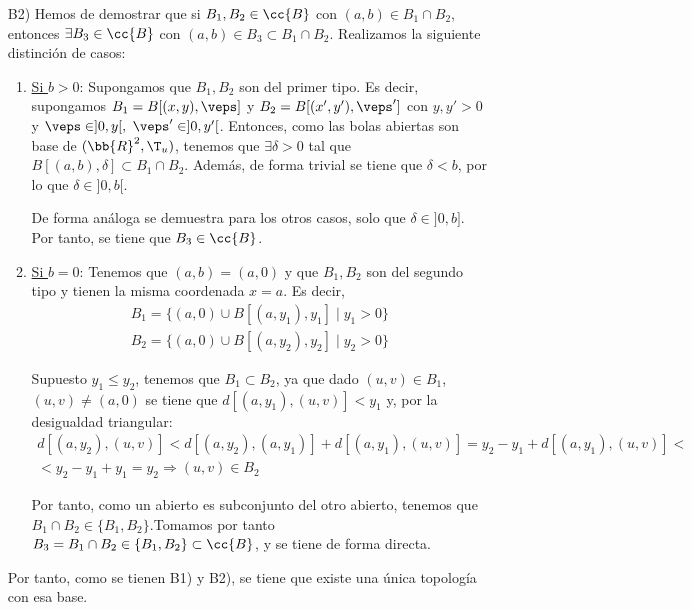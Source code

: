 \begin{ejercicio}
\begin{enumerate}
        \item[B2)] Hemos de demostrar que si $B_1,B_2\in \cc{B}$ con $(a,b)\in B_1\cap B_2$, entonces $\exists B_3\in \cc{B}$ con $(a,b)\in B_3\subset B_1\cap B_2$. Realizamos la siguiente distinción de casos:
        \begin{enumerate}
            \item \ul{Si $b>0$}: Supongamos que $B_1,B_2$ son del primer tipo. Es decir, supongamos $B_1=B[(x,y),\veps]$ y $B_2=B[(x',y'),\veps']$ con $y,y'>0$ y $\veps\in ]0,y[,$ $\veps'\in ]0,y'[$. Entonces, como las bolas abiertas son base de $(\bb{R}^2,\T_u)$, tenemos que $\exists \delta >0$ tal que $B[(a,b),\delta]\subset B_1\cap B_2$. Además, de forma trivial se tiene que $\delta <b$, por lo que $\delta\in ]0,b[$.
            
            
            De forma análoga se demuestra para los otros casos, solo que $\delta \in ]0,b]$. Por tanto, se tiene que $B_3\in \cc{B}$.

            \item \ul{Si $b=0$}: Tenemos que $(a,b)=(a,0)$ y que $B_1,B_2$ son del segundo tipo y tienen la misma coordenada $x=a$. Es decir,
            \begin{gather*}
                B_1=\{(a,0)\cup B[(a,y_1),y_1]\mid y_1>0\} \\
                B_2=\{(a,0)\cup B[(a,y_2),y_2]\mid y_2>0\}
            \end{gather*}

            Supuesto $y_1\leq y_2$, tenemos que $B_1\subset B_2$, ya que dado $(u,v)\in B_1$, $(u,v)\neq (a,0)$ se tiene que $d[(a,y_1),(u,v)]<y_1$ y, por la desigualdad triangular:
            \begin{multline*}
                d[(a,y_2),(u,v)]<d[(a,y_2),(a,y_1)] + d[(a,y_1),(u,v)] = y_2-y_1+d[(a,y_1),(u,v)] <\\< y_2-y_1+y_1 = y_2 \Longrightarrow (u,v)\in B_2
            \end{multline*}
            
            Por tanto, como un abierto es subconjunto del otro abierto, tenemos que $B_1\cap B_2\in \{B_1,B_2\}$.Tomamos por tanto $B_3=B_1\cap B_2\in \{B_1,B_2\}\subset \cc{B}$, y se tiene de forma directa.
        \end{enumerate}

        Por tanto, como se tienen B1) y B2), se tiene que existe una única topología con esa base.
    \end{enumerate}
\end{ejercicio}


